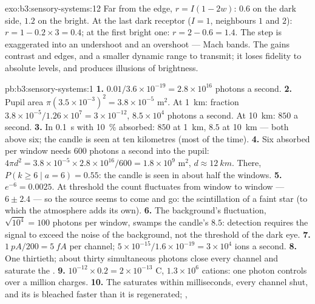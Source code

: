 \begin{solution}{exo:b3:sensory-systems:12}
Far from the edge, $r = I(1 - 2w)$: $0.6$ on the dark side, $1.2$ on the
bright. At the last dark receptor ($I = 1$, neighbours $1$ and $2$): $r
= 1 - 0.2\times 3 = 0.4$; at the first bright one: $r = 2 - 0.6 = 1.4$.
The step is exaggerated into an undershoot and an overshoot --- Mach
bands. The  gains contrast and edges, and a smaller dynamic range
to transmit; it loses fidelity to absolute levels, and produces
illusions of brightness.
\end{solution}

\begin{solution}{pb:b3:sensory-systems:1}
\textbf{1.} $0.01/3.6\times 10^{-19} = 2.8\times 10^{16}$ photons a
second.
\textbf{2.} Pupil area $\pi(3.5\times 10^{-3})^{2} = 3.8\times 10^{-5}$
m$^{2}$. At \qty{1}{km}: fraction $3.8\times 10^{-5}/1.26\times 10^{7} =
3\times 10^{-12}$, $8.5\times 10^{4}$ photons a second. At \qty{10}{km}:
$850$ a second.
\textbf{3.} In \qty{0.1}{s} with \qty{10}{\%} absorbed: $850$ at
\qty{1}{km}, $8.5$ at \qty{10}{km} --- both above six; the candle is
seen at ten kilometres (most of the time).
\textbf{4.} Six absorbed per window needs $600$ photons a second into
the pupil: $4\pi d^{2} = 3.8\times 10^{-5}\times 2.8\times 10^{16}/600
= 1.8\times 10^{9}$ m$^{2}$, $d \approx \qty{12}{km}$. There, $P(k \ge
6 \mid a = 6) = 0.55$: the candle is seen in about half the windows.
\textbf{5.} $e^{-6} = 0.0025$. At threshold the count fluctuates from
window to window --- $6 \pm 2.4$ --- so the source seems to come and go:
the scintillation of a faint star (to which the atmosphere adds its
own).
\textbf{6.} The background's fluctuation, $\sqrt{10^{4}} = 100$ photons
per window, swamps the candle's $8.5$: detection requires the signal to
exceed the noise of the background, not the threshold of the dark eye.
\textbf{7.} $\qty{1}{pA}/200 = \qty{5}{fA}$ per channel; $5\times
10^{-15}/1.6\times 10^{-19} = 3\times 10^{4}$ ions a second.
\textbf{8.} One thirtieth; about thirty simultaneous photons close every
channel and saturate the .
\textbf{9.} $10^{-12}\times 0.2 = 2\times 10^{-13}$ C, $1.3\times 10^{6}$
cations: one photon controls over a million charges.
\textbf{10.} The  saturates within milliseconds, every channel shut,
and its  is bleached faster than it is regenerated; ,

\end{solution}
